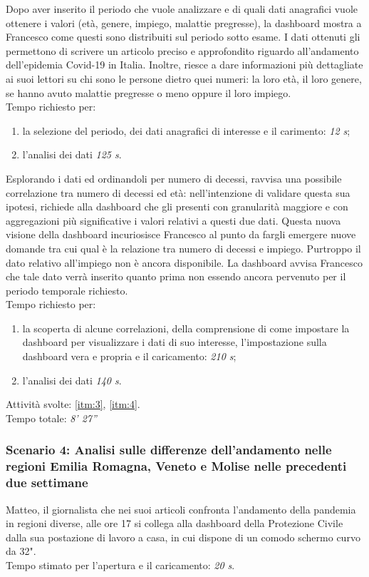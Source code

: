 Dopo aver inserito il periodo che vuole analizzare e di quali dati anagrafici vuole ottenere i valori (età, genere, impiego, malattie pregresse), la dashboard mostra a Francesco come questi sono distribuiti sul periodo sotto esame. 
I dati ottenuti gli permettono di scrivere un articolo preciso e approfondito riguardo all'andamento dell'epidemia Covid-19 in Italia. Inoltre, riesce a dare informazioni più dettagliate ai suoi lettori su chi sono le persone dietro quei numeri: la loro età, il loro genere, se hanno avuto malattie pregresse o meno oppure il loro impiego.\\
Tempo richiesto per:
\begin{enumerate}
    \item la selezione del periodo, dei dati anagrafici di interesse e il carimento: \textit{12 s};
    \item l'analisi dei dati \textit{125 s}.
\end{enumerate}

Esplorando i dati ed ordinandoli per numero di decessi, ravvisa una possibile correlazione tra numero di decessi ed età: nell'intenzione di validare questa sua ipotesi, richiede alla dashboard che gli presenti con granularità maggiore e con aggregazioni più significative i valori relativi a questi due dati. 
Questa nuova visione della dashboard incuriosisce Francesco al punto da fargli emergere nuove domande tra cui qual è la relazione tra numero di decessi e impiego. Purtroppo il dato relativo all'impiego non è ancora disponibile. La dashboard avvisa Francesco che tale dato verrà inserito quanto prima non essendo ancora pervenuto per il periodo temporale richiesto.\\
Tempo richiesto per:
\begin{enumerate}
    \item la scoperta di alcune correlazioni, della comprensione di come impostare la dashboard per visualizzare i dati di suo interesse, l'impostazione sulla dashboard vera e propria e il caricamento: \textit{210 s};
    \item l'analisi dei dati \textit{140 s}.
\end{enumerate}
\noindent
Attività svolte: \ref{itm:3}, \ref{itm:4}.\\ 
Tempo totale: \textit{8' 27''} 

\subsubsection*{Scenario 4: Analisi sulle differenze dell'andamento nelle regioni Emilia Romagna, Veneto e Molise nelle precedenti due settimane}
Matteo, il giornalista che nei suoi articoli confronta l'andamento della pandemia in regioni diverse, alle ore 17 si collega alla dashboard della Protezione Civile dalla sua postazione di lavoro a casa, in cui dispone di un comodo schermo curvo da 32".\\
Tempo stimato per l'apertura e il caricamento: \textit{20 s}. 

